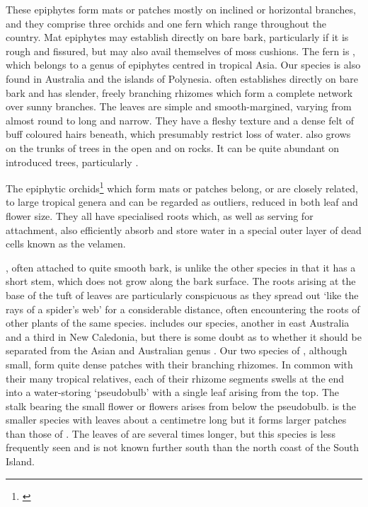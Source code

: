 These epiphytes form mats or patches mostly on inclined or horizontal branches, and they comprise three orchids and one fern which range throughout the country.
Mat epiphytes may establish directly on bare bark, particularly if it is rough and fissured, but may also avail themselves of moss cushions.
The fern is , which belongs to a genus of epiphytes centred in tropical Asia.
Our species is also found in Australia and the islands of Polynesia.  often establishes directly on bare bark and has slender, freely branching rhizomes which form a complete network over sunny branches.
The leaves are simple and smooth-margined, varying from almost round to long and narrow.
They have a fleshy texture and a dense felt of buff coloured hairs beneath, which presumably restrict loss of water.  also grows on the trunks of trees in the open and on rocks.
It can be quite abundant on introduced trees, particularly .

The epiphytic orchids\footnote{\cite{hatch1948epiphytic}} which form mats or patches belong, or are closely related, to large tropical genera and can be regarded as outliers, reduced in both leaf and flower size.
They all have specialised roots which, as well as serving for attachment, also efficiently absorb and store water in a special outer layer of dead cells known as the velamen.

, often attached to quite smooth bark, is unlike the other species in that it has a short stem, which does not grow along the bark surface.
The roots arising at the base of the tuft of leaves are particularly conspicuous as they spread out `like the rays of a spider's web' for a considerable distance, often encountering the roots of other plants of the same species.  includes our species, another in east Australia and a third in New Caledonia, but there is some doubt as to whether it should be separated from the Asian and Australian genus .
Our two species of , although small, form quite dense patches with their branching rhizomes.
In common with their many tropical relatives, each of their rhizome segments swells at the end into a water-storing `pseudobulb' with a single leaf arising from the top.
The stalk bearing the small flower or flowers arises from below the pseudobulb.  is the smaller species with leaves about a centimetre long but it forms larger patches than those of .
The leaves of  are several times longer, but this species is less frequently seen and is not known further south than the north coast of the South Island.

